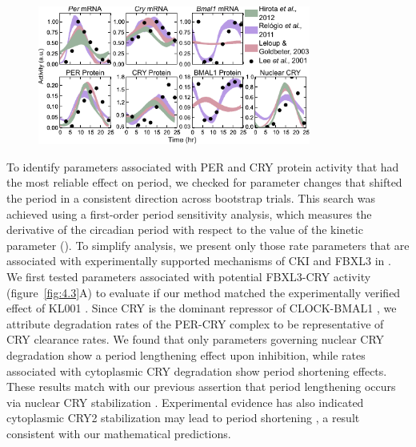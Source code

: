 \begin{figure}[h]
  \centering
  \includegraphics[width=0.8\textwidth]{chap4/figures/fig2.pdf}
  \label{fig:4.2}
\end{figure}

To identify parameters associated with PER and CRY protein activity that had the most reliable effect on period, we checked for parameter changes that shifted the period in a consistent direction across bootstrap trials. 
This search was achieved using a first-order period sensitivity analysis, which measures the derivative of the circadian period with respect to the value of the kinetic parameter (). 
To simplify analysis, we present only those rate parameters that are associated with experimentally supported mechanisms of CKI and FBXL3 in . 
 We first tested parameters associated with potential FBXL3-CRY activity (figure~\ref{fig:4.3}A) to evaluate if our method matched the experimentally verified effect of KL001 \cite{Hirota2012}. 
Since CRY is the dominant repressor of CLOCK-BMAL1 \cite{Ye2011}, we attribute degradation rates of the PER-CRY complex to be representative of CRY clearance rates. 
We found that only parameters governing nuclear CRY degradation show a period lengthening effect upon inhibition, while rates associated with cytoplasmic CRY degradation show period shortening effects. 
These results match with our previous assertion that period lengthening occurs via nuclear CRY stabilization \cite{Hirota2012}. 
Experimental evidence has also indicated cytoplasmic CRY2 stabilization may lead to period shortening \cite{Kurabayashi2010}, a result consistent with our mathematical predictions.


